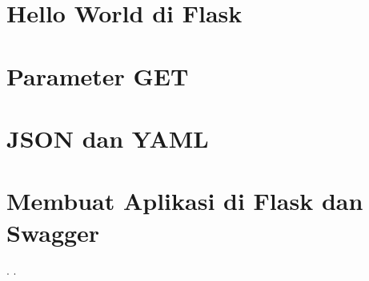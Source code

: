 \documentclass{wileySix}
\begin{document}
\chapter[Hello World di Flask]
{Hello World di Flask}



\chapter[GET]
{Parameter GET}


\chapter[Json dan YAML]
{JSON dan YAML}




\chapter[Membuat Aplikasi di Flask dan Swagger]
{Membuat Aplikasi di Flask dan Swagger}







.
.

\printindex
\end{document}
